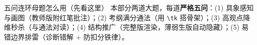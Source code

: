
\begin{warmupbox}{五问连环母题怎么用（先看这里）}
本部分两道大题，每道\textbf{严格五问}：(1) 具象感知与画图（教师版附红笔批注）；(2) 考纲满分通法（用 \texttt{\textbackslash tk} 搭骨架）；(3) 高观点降维秒杀（与通法对读）；(4) 结构推广（完整版渲染，薄弱生版自动隐藏）；(5) 易错边界排雷（诊断错解 + 防扣分铁律）。
\end{warmupbox}


